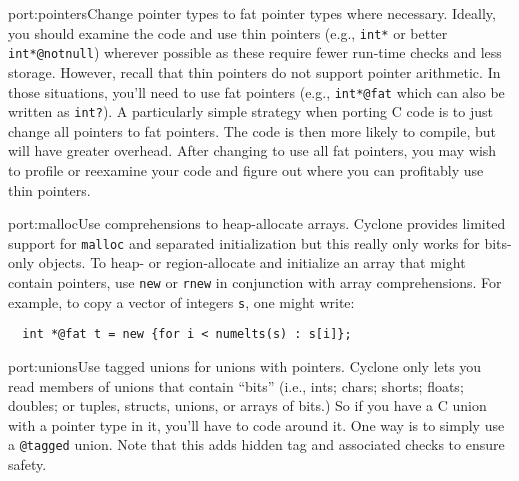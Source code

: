 \begin{porta}{port:pointers}{Change pointer types to fat pointer types where necessary.}  
Ideally, you should examine the code and use thin pointers (e.g., \texttt{int*}
or better \texttt{int*@notnull}) wherever possible as these require fewer
run-time checks and less storage.  However, recall that thin pointers
do not support pointer arithmetic.  In those situations, you'll need
to use fat pointers (e.g., \texttt{int*@fat} which can also be written
as \texttt{int?}).  A particularly simple strategy 
when porting C code is to just change all pointers to fat pointers.
The code is then more likely to compile, but will have greater overhead.
After changing to use all fat pointers, you may wish to profile or reexamine
your code and figure out where you can profitably use thin pointers.
\end{porta}

\begin{porta}{port:malloc}{Use comprehensions to heap-allocate arrays.}
Cyclone provides limited support for \texttt{malloc} and separated
initialization but this really only works for bits-only objects.
To heap- or region-allocate and initialize an array that might contain
pointers, use
\texttt{new} or \texttt{rnew} in conjunction with array comprehensions.  
For example, to copy a vector of integers \texttt{s}, one might write:
\begin{verbatim}
  int *@fat t = new {for i < numelts(s) : s[i]};
\end{verbatim}
\end{porta}

\begin{porta}{port:unions}{Use tagged unions for unions with pointers.}
Cyclone only lets you read members of unions that 
contain ``bits'' (i.e., ints; chars;
shorts; floats; doubles; or tuples, structs, unions, or arrays of bits.)
So if you have a C union with a pointer type in it, you'll have to
code around it.  One way is to simply use a \texttt{@tagged} union.
Note that this adds hidden tag and associated checks to ensure safety.
\end{porta}

